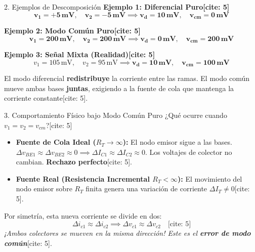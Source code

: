 \documentclass[aspectratio=169]{beamer}
\begin{document}
\begin{frame}{2. Ejemplos de Descomposición}
    \textbf{Ejemplo 1: Diferencial Puro[cite: 5]}
    \begin{equation*}
        \bm{v_1 = +5\,\text{mV}, \quad v_2 = -5\,\text{mV} \implies \mathbf{v_d = 10\,\text{mV}}, \quad \mathbf{v_{cm} = 0\,\text{mV}}}
    \end{equation*}
    
    \vspace{0.2cm}
    \textbf{Ejemplo 2: Modo Común Puro[cite: 5]}
    \begin{equation*}
        \bm{v_1 = 200\,\text{mV}, \quad v_2 = 200\,\text{mV} \implies \mathbf{v_d = 0\,\text{mV}}, \quad \mathbf{v_{cm} = 200\,\text{mV}}}
    \end{equation*}
    
    \vspace{0.2cm}
    \textbf{Ejemplo 3: Señal Mixta (Realidad)[cite: 5]}
    \begin{equation*}
        v_1 = 105\,\text{mV}, \quad v_2 = 95\,\text{mV} \implies \mathbf{v_d = 10\,\text{mV}}, \quad \mathbf{v_{cm} = 100\,\text{mV}}
    \end{equation*}
    
    \begin{tcolorbox}[colback=yellow!10, colframe=orange, title=Nota Conceptual]
        El modo diferencial \textbf{redistribuye} la corriente entre las ramas. El modo común mueve ambas bases \textbf{juntas}, exigiendo a la fuente de cola que mantenga la corriente constante[cite: 5].
    \end{tcolorbox}
\end{frame}

\begin{frame}{3. Comportamiento Físico bajo Modo Común Puro}
    ¿Qué ocurre cuando $v_1 = v_2 = v_{cm}$?[cite: 5]
    
    \begin{itemize}
        \item \textbf{Fuente de Cola Ideal ($R_T \to \infty$):} El nodo emisor sigue a las bases. $\Delta v_{BE1} \approx \Delta v_{BE2} \approx 0 \implies \Delta I_{C1} \approx \Delta I_{C2} \approx 0$. Los voltajes de colector no cambian. \textbf{Rechazo perfecto}[cite: 5].
        \item \textbf{Fuente Real (Resistencia Incremental $R_T < \infty$):} El movimiento del nodo emisor sobre $R_T$ finita genera una variación de corriente $\Delta I_T \neq 0$[cite: 5]. 
    \end{itemize}
    
    \vspace{0.2cm}
    Por simetría, esta nueva corriente se divide en dos:
    \begin{equation*}
        \Delta i_{c1} \approx \Delta i_{c2} \implies \Delta v_{c1} \approx \Delta v_{c2} \quad \text{[cite: 5]}
    \end{equation*}
    \textit{¡Ambos colectores se mueven en la misma dirección! Este es el \textbf{error de modo común}}[cite: 5].
\end{frame}
\end{document}
